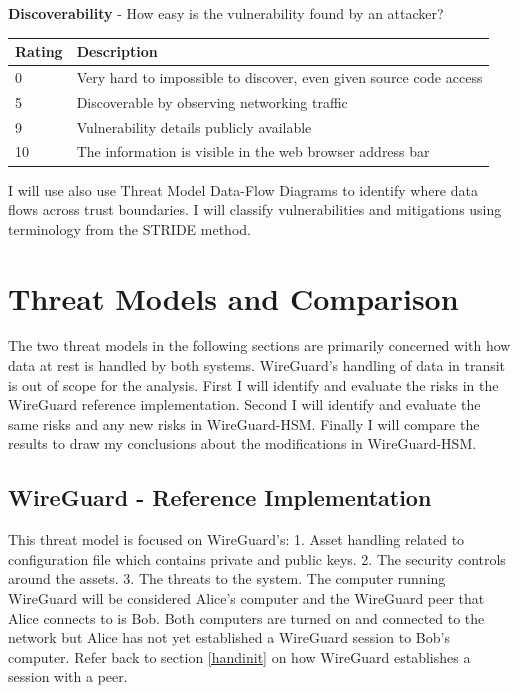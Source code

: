 \documentclass [11pt, proquest] {uwthesis}[2020/02/24]
\begin{document}
\begin{table}[H]
\label{dread:discover}
\raggedright
\textbf{Discoverability} - How easy is the vulnerability found by an attacker?
\begin{tabular}{|m{1.5cm}|p{15cm} |}
\hline
Rating & Description \\
\hline
0 &   Very hard to impossible to discover, even given source code access \\
\hline
5 &  Discoverable by observing networking traffic  \\
\hline
9 &   Vulnerability details publicly available \\
\hline
10 &  The information is visible in the web browser address bar \\
\hline
\end{tabular}
\end{table}

I will use also use Threat Model Data-Flow Diagrams to identify where data flows across trust boundaries.
I will classify vulnerabilities and mitigations using terminology from the STRIDE method\cite{hernan_uncover_2019}.

\chapter {Threat Models and Comparison}
The two threat models in the following sections are primarily concerned with how data at rest is handled by both systems. WireGuard's handling of data in transit is out of scope for the analysis.
First I will identify and evaluate the risks in the WireGuard reference implementation. Second I will identify and evaluate the same risks and any new risks in WireGuard-HSM. Finally I will compare the results to draw my conclusions about the modifications in WireGuard-HSM.

\section {WireGuard - Reference Implementation}
\label{wg-ref-analysis}
This threat model is focused on WireGuard's: 1. Asset handling related to configuration file which contains private and public keys. 2. The security controls around the assets. 3. The threats to the system. 
The computer running WireGuard will be considered Alice's computer and the WireGuard peer that Alice connects to is Bob. Both computers are turned on and connected to the network but Alice has not yet established a WireGuard session to Bob's computer. Refer back to section \ref{handinit} on how WireGuard establishes a session with a peer. 
\end{document}
